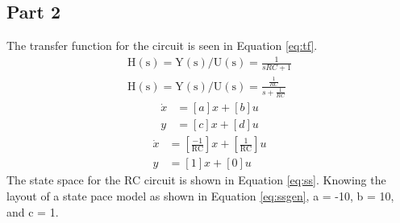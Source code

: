 \documentclass[12pt]{article}
\begin{document}
		\subsection{Part 2}
		The transfer function for the circuit is seen in Equation \ref{eq:tf}.
		\begin{equation} \label{eq:tf}
			\begin{aligned}
				\mathrm{H}(\mathrm{s})=\mathrm{Y}(\mathrm{s}) / \mathrm{U}(\mathrm{s})=\frac{1}{s R C+1} \\ 	\mathrm{H}(\mathrm{s})=\mathrm{Y}(\mathrm{s}) / \mathrm{U}(\mathrm{s})=\frac{\frac{1}{R C}}{s+\frac{1}{R C}}
			\end{aligned}
		\end{equation}
		\begin{equation} \label{eq:ssgen}
			\begin{aligned}
				\dot{x} & = [a] x + [b] u \\
				y & =[c] x + [d] u
			\end{aligned}
		\end{equation}
		\begin{equation} \label{eq:ss}
			\begin{aligned}
				\dot{x} & =\left[\frac{-1}{\mathrm{RC}}\right] x+\left[\frac{1}{\mathrm{RC}}\right] u \\
				y & =[1] x + [0] u
			\end{aligned}
		\end{equation}
		The state space for the RC circuit is shown in Equation \ref{eq:ss}. Knowing the layout of a state pace model as shown in Equation \ref{eq:ssgen}, a = -10, b = 10, and c =  1.
\end{document}
